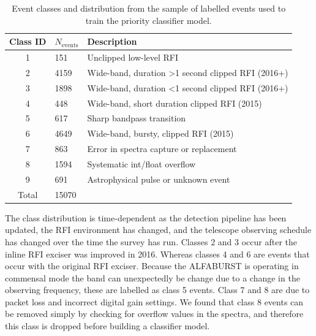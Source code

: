 \documentclass[a4paper,fleqn,usenatbib]{mnras}
\begin{document}
\begin{table}
\centering
\begin{tabularx}{\linewidth}{clX}
\hline
Class ID & $N_{\textrm{events}}$ & Description                                     \\
\hline
1        & 151     & Unclipped low-level RFI                                       \\
2        & 4159    & Wide-band, duration \textgreater 1 second clipped RFI (2016+) \\
3        & 1898    & Wide-band, duration \textless 1 second clipped RFI (2016+)    \\
4        & 448     & Wide-band, short duration clipped RFI (2015)                  \\
5        & 617     & Sharp bandpass transition                                     \\
6        & 4649    & Wide-band, bursty, clipped RFI (2015)                         \\
7        & 863     & Error in spectra capture or replacement                       \\
8        & 1594    & Systematic int/float overflow                                 \\
9        & 691     & Astrophysical pulse or unknown event                          \\
\hline
Total    & 15070   &                                                              
\end{tabularx}
\caption{Event classes and distribution from the sample of labelled events used
to train the priority classifier model.}
\label{tbl:event_classes}
\end{table}

The class distribution is time-dependent as the detection pipeline has been
updated, the RFI environment has changed, and the telescope observing schedule
has changed over the time the survey has run. Classes 2 and 3 occur after the
inline RFI exciser was improved in 2016. Whereas classes 4 and 6 are events
that occur with the original RFI exciser. Because the ALFABURST is operating in
commensal mode the band can unexpectedly be change due to a change in the
observing frequency, these are labelled as class 5 events. Class 7 and 8 are due
to packet loss and incorrect digital gain settings. We found that class 8 events
can be removed simply by checking for overflow values in the spectra, and
therefore this class is dropped before building a classifier model.
\end{document}
